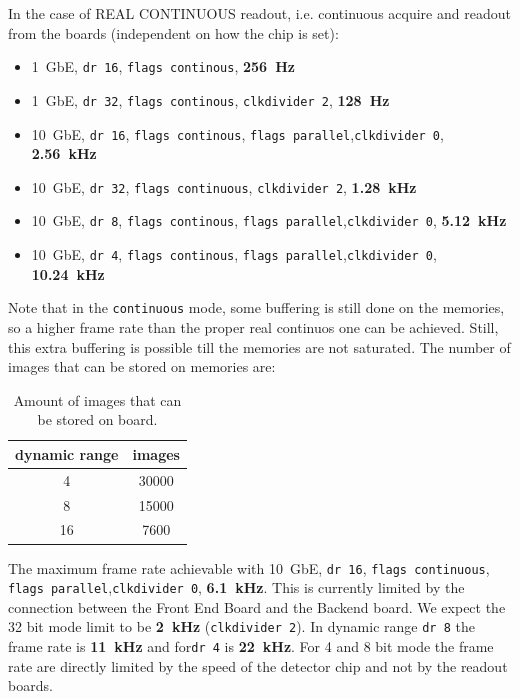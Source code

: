 \documentclass{article}
\begin{document}
In the case of REAL CONTINUOUS readout, i.e. continuous acquire and readout from the boards (independent on how the chip is set):
\begin{itemize}
\item 1~GbE, {\tt{dr 16}}, {\tt{flags continous}}, \textbf{256~Hz} 
\item 1~GbE, {\tt{dr 32}}, {\tt{flags continous}}, {\tt{clkdivider 2}}, \textbf{128~Hz}
\item 10~GbE, {\tt{dr 16}}, {\tt{flags continous}}, {\tt{flags parallel}},{\tt{clkdivider 0}}, \textbf{2.56~kHz}  
\item 10~GbE, {\tt{dr 32}}, {\tt{flags continuous}}, {\tt{clkdivider 2}}, \textbf{1.28~kHz}  
\item 10~GbE, {\tt{dr 8}}, {\tt{flags continous}}, {\tt{flags parallel}},{\tt{clkdivider 0}}, \textbf{5.12~kHz}
\item 10~GbE, {\tt{dr 4}}, {\tt{flags continous}}, {\tt{flags parallel}},{\tt{clkdivider 0}}, \textbf{10.24~kHz}
\end{itemize}
Note that in the {\tt{continuous}} mode, some buffering is still done on the memories, so a higher frame rate than the proper real continuos one can be achieved. Still, this extra buffering is possible till the memories are not saturated. 
The number of images that can be stored on memories are:
\begin{table}
\begin{tabular}{|c|c|}
\hline
dynamic range & images\\
\hline
4 & 30000\\
\hline
8 & 15000\\
\hline
16 & 7600\\
\hline
\end{tabular}
\caption{Amount of images that can be stored on board.}
\end{table}

The maximum frame rate achievable with 10~GbE, {\tt{dr 16}}, {\tt{flags continuous}}, {\tt{flags parallel}},{\tt{clkdivider 0}}, \textbf{6.1~kHz}. This is currently limited by the connection between the Front End Board and the Backend board. We expect the 32 bit mode limit to be \textbf{2~kHz} ({\tt{clkdivider 2}}).
 In dynamic range {\tt{dr 8}} the frame rate is \textbf{11~kHz} and for{\tt{dr 4}} is \textbf{22~kHz}. For 4 and 8 bit mode the frame rate are directly limited by the speed of the detector chip and not by the readout boards.    
\end{document}

